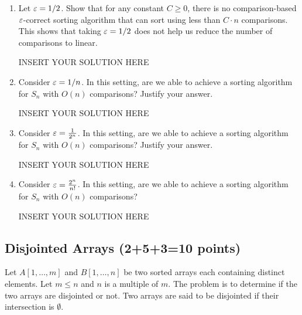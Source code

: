 \begin{enumerate}[resume]
    \item Let $\varepsilon=1/2$. Show that for any constant $C\geq 0$, there is no comparison-based $\varepsilon$-correct sorting algorithm that can sort using less than $C \cdot n$ comparisons. This shows that taking $\varepsilon=1/2$ does not help us reduce the number of comparisons to linear. 
\begin{solution}   INSERT YOUR SOLUTION HERE   \end{solution}

    \item Consider $\varepsilon=1/n$. In this setting, are we able to achieve a sorting algorithm for $S_n$ with $O(n)$ comparisons? Justify your answer.
\begin{solution}   INSERT YOUR SOLUTION HERE   \end{solution}
    
    \item Consider $\varepsilon=\frac{1}{2^n}$. In this setting, are we able to achieve a sorting algorithm for $S_n$ with $O(n)$ comparisons? Justify your answer.
\begin{solution}   INSERT YOUR SOLUTION HERE   \end{solution}
    
    \item Consider $\varepsilon=\frac{2^n}{n!}$. In this setting, are we able to achieve a sorting algorithm for $S_n$ with $O(n)$ comparisons?
\begin{solution}   INSERT YOUR SOLUTION HERE   \end{solution}
\end{enumerate}



\subsection*{Disjointed Arrays (2+5+3=10 points)}
Let $A[1,\ldots,m]$ and $B[1,\ldots,n]$ be two sorted
arrays each containing distinct elements. Let
$m\leq n$ and $n$ is a multiple of $m$. 
The problem is to determine if the two arrays
are disjointed or not. Two arrays are said
to be disjointed if their intersection is
$\emptyset$. 

